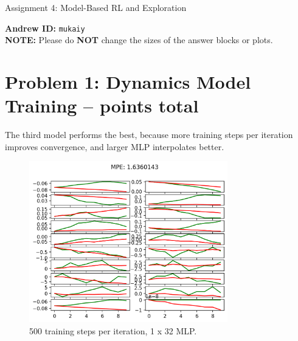 \documentclass{article}
\begin{document}

\begin{centering}
    {\Large Assignment 4: Model-Based RL and Exploration
    } \\
    \vspace{.25cm}
\end{centering}
\vspace{0.25cm}

\textbf{Andrew ID:} \texttt{mukaiy} \\
\textbf{NOTE:} Please do \textbf{NOT} change the sizes of the answer blocks or plots.

\section{Problem 1: Dynamics Model Training --  points total\rbrack}
\begin{answer}[title=Theory questions,height=4.5cm,width=\linewidth]
    The third model performs the best, because more training steps per iteration improves convergence, and larger MLP interpolates better.
\end{answer}


\begin{answer}[title=Plot,height=9.5cm,width=\linewidth]
    \begin{figure}[H]
        \centering
        \includegraphics[height=7cm]{figs/Q1_1.png}
        \caption{500 training steps per iteration, 1 x 32 MLP.}
    \end{figure}
\end{answer}
\end{document}
